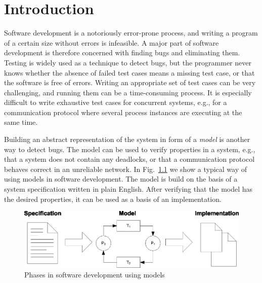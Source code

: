 \chapter{Introduction}
\label{chap:introduction}

Software development is a notoriously error-prone process, and writing a program of a certain size without errors is infeasible. A major part of software development is therefore concerned with finding bugs and eliminating them. Testing is widely used as a technique to detect bugs, but the programmer never knows whether the absence of failed test cases means a missing test case, or that the software is free of errors. Writing an appropriate set of test cases can be very challenging, and running them can be a time-consuming process. It is especially difficult to write exhaustive test cases for concurrent systems, e.g., for a communication protocol where several process instances are executing at the same time.

Building an abstract representation of the system in form of a \emph{model} is another way to detect bugs. The model can be used to verify properties in a system, e.g., that a system does not contain any deadlocks, or that a communication protocol behaves correct in an unreliable network. In Fig.~\ref{fig:specmodelimpl} we show a typical way of using models in software development. The model is build on the basis of a system specification written in plain English. After verifying that the model has the desired properties, it can be used as a basis of an implementation. 

\begin{figure}[h!]
\centering
\includegraphics[scale=0.7]{introduction/graphics/spec_model_impl_figure.eps}
\caption{Phases in software development using models}
\label{fig:specmodelimpl}
\end{figure}

